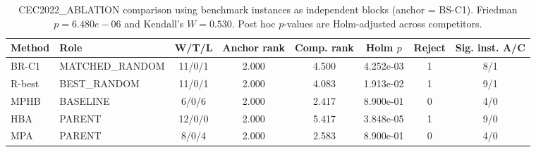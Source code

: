 \begin{table}[!t]
\centering
\footnotesize
\caption{CEC2022\_ABLATION comparison using benchmark instances as independent blocks (anchor = BS-C1). Friedman $p=6.480e-06$ and Kendall's $W=0.530$. Post hoc $p$-values are Holm-adjusted across competitors.}
\begin{tabular}{llcccccc}
\hline
Method & Role & W/T/L & Anchor rank & Comp. rank & Holm $p$ & Reject & Sig. inst. A/C \\
\hline
BR-C1 & MATCHED\_RANDOM & 11/0/1 & 2.000 & 4.500 & 4.252e-03 & 1 & 8/1 \\
R-best & BEST\_RANDOM & 11/0/1 & 2.000 & 4.083 & 1.913e-02 & 1 & 9/1 \\
MPHB & BASELINE & 6/0/6 & 2.000 & 2.417 & 8.900e-01 & 0 & 4/0 \\
HBA & PARENT & 12/0/0 & 2.000 & 5.417 & 3.848e-05 & 1 & 9/0 \\
MPA & PARENT & 8/0/4 & 2.000 & 2.583 & 8.900e-01 & 0 & 4/0 \\
\hline
\end{tabular}
\end{table}
